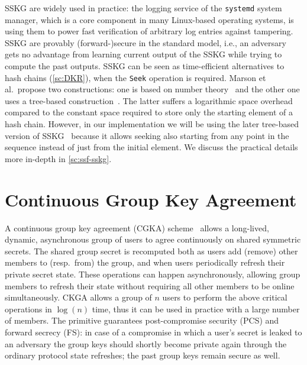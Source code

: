 SSKG are widely used in practice:
the logging service of the \texttt{systemd} system manager,
which is a core component in many Linux-based operating systems,
is using them to power fast verification of arbitrary log entries against tampering.
SSKG are provably (forward-)secure in the standard model, i.e.,
an adversary gets no advantage from learning current output of the SSKG
while trying to compute the past outputs.
SSKG can be seen as time-efficient alternatives to hash chains (\cref{sc:DKR}),
when the \texttt{Seek} operation is required.
Marson et al.\ propose two constructions: one is based on number theory~\cite{ESORICS:MarPoe13}
and the other one uses a tree-based construction~\cite{ESORICS:MarPoe14}.
The latter suffers a logarithmic space overhead 
compared to the constant space required to store 
only the starting element of a hash chain.
However, in our implementation we will be using the later tree-based version of SSKG~\cite{ESORICS:MarPoe14}
because it allows seeking also starting from any point in the sequence
instead of just from the initial element.
We discuss the practical details more in-depth in \cref{sc:ssf-sskg}.

\section{Continuous Group Key Agreement}\label{sc:CGKA}

A continuous group key agreement (CGKA) scheme~\cite{C:ACDT20}
allows a long-lived, dynamic, asynchronous group of users to agree 
continuously on shared symmetric secrets.
The shared group secret is recomputed both as users add (remove)
other members to (resp.\ from) the group, and when users periodically
refresh their private secret state. These operations can happen
asynchronously, allowing group members to refresh their 
state without requiring all other members to be online 
simultaneously.
CKGA allows a group of $n$ users to perform the above critical 
operations in $\log(n)$ time,
thus it can be used in practice with a large number of members.
The primitive guarantees post-compromise security (PCS) and forward secrecy (FS):
in case of a compromise in which a user's secret is leaked
to an adversary the group keys should shortly become private
again through the ordinary protocol state refreshes; the past
group keys remain secure as well.

